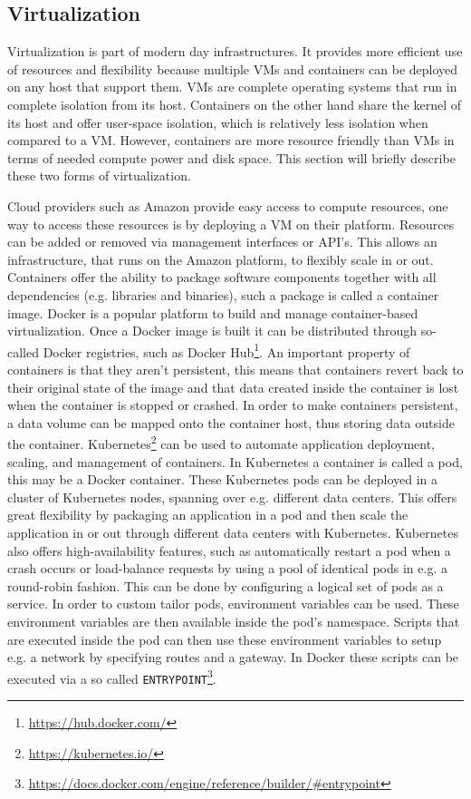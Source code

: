 \subsection{Virtualization}
\label{overview-virtualization}
Virtualization is part of modern day infrastructures. It provides more efficient use of resources and flexibility because multiple VMs and containers can be deployed on any host that support them. VMs are complete operating systems that run in complete isolation from its host. Containers on the other hand share the kernel of its host and offer user-space isolation, which is relatively less isolation when compared to a VM. However, containers are more resource friendly than VMs in terms of needed compute power and disk space. This section will briefly describe these two forms of virtualization.

Cloud providers such as Amazon provide easy access to compute resources, one way to access these resources is by deploying a VM on their platform. Resources can be added or removed via management interfaces or API's. This allows an infrastructure, that runs on the Amazon platform, to flexibly scale in or out. Containers offer the ability to package software components together with all dependencies (e.g. libraries and binaries), such a package is called a container image. Docker is a popular platform to build and manage container-based virtualization. Once a Docker image is built it can be distributed through so-called Docker registries, such as Docker Hub\footnote{\url{https://hub.docker.com/}}. An important property of containers is that they aren't persistent, this means that containers revert back to their original state of the image and that data created inside the container is lost when the container is stopped or crashed. In order to make containers persistent, a data volume can be mapped onto the container host, thus storing data outside the container. Kubernetes\footnote{\url{https://kubernetes.io/}} can be used to automate application deployment, scaling, and management of containers. In Kubernetes a container is called a pod, this may be a Docker container. These Kubernetes pods can be deployed in a cluster of Kubernetes nodes, spanning over e.g. different data centers. This offers great flexibility by packaging an application in a pod and then scale the application in or out through different data centers with Kubernetes. Kubernetes also offers high-availability features, such as automatically restart a pod when a crash occurs or load-balance requests by using a pool of identical pods in e.g. a round-robin fashion. This can be done by configuring a logical set of pods as a service. In order to custom tailor pods, environment variables can be used. These environment variables are then available inside the pod's namespace. Scripts that are executed inside the pod can then use these environment variables to setup e.g. a network by specifying routes and a gateway. In Docker these scripts can be executed via a so called \texttt{ENTRYPOINT}\footnote{\url{https://docs.docker.com/engine/reference/builder/\#entrypoint}}.